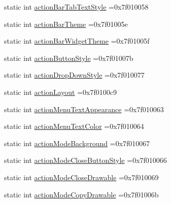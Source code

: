 \begin{DoxyCompactItemize}
\item 
static int \hyperlink{classandroid_1_1support_1_1graphics_1_1drawable_1_1animated_1_1R_1_1attr_a17cad979e945809355c270ab74105a21}{action\+Bar\+Tab\+Text\+Style} =0x7f010058
\item 
static int \hyperlink{classandroid_1_1support_1_1graphics_1_1drawable_1_1animated_1_1R_1_1attr_aa89584f12a04f4447018cd3eb7c0330d}{action\+Bar\+Theme} =0x7f01005e
\item 
static int \hyperlink{classandroid_1_1support_1_1graphics_1_1drawable_1_1animated_1_1R_1_1attr_a76a24821385225fbace8712d058fa8a2}{action\+Bar\+Widget\+Theme} =0x7f01005f
\item 
static int \hyperlink{classandroid_1_1support_1_1graphics_1_1drawable_1_1animated_1_1R_1_1attr_a45847dd7ab384af23da04459d99e0fa1}{action\+Button\+Style} =0x7f01007b
\item 
static int \hyperlink{classandroid_1_1support_1_1graphics_1_1drawable_1_1animated_1_1R_1_1attr_a2ef9988d482d2529b6d641459a8a83c5}{action\+Drop\+Down\+Style} =0x7f010077
\item 
static int \hyperlink{classandroid_1_1support_1_1graphics_1_1drawable_1_1animated_1_1R_1_1attr_a7f251e2bd4fc4623314f20d26a3c292c}{action\+Layout} =0x7f0100c9
\item 
static int \hyperlink{classandroid_1_1support_1_1graphics_1_1drawable_1_1animated_1_1R_1_1attr_af9f235290c841079f30759146f4108d6}{action\+Menu\+Text\+Appearance} =0x7f010063
\item 
static int \hyperlink{classandroid_1_1support_1_1graphics_1_1drawable_1_1animated_1_1R_1_1attr_aa4a600af765c1e79751967f00fd8aa1e}{action\+Menu\+Text\+Color} =0x7f010064
\item 
static int \hyperlink{classandroid_1_1support_1_1graphics_1_1drawable_1_1animated_1_1R_1_1attr_a4ec2434077e4165be480e3e660ac56ee}{action\+Mode\+Background} =0x7f010067
\item 
static int \hyperlink{classandroid_1_1support_1_1graphics_1_1drawable_1_1animated_1_1R_1_1attr_aa412b79bda304501e47cdf9102fc1dd7}{action\+Mode\+Close\+Button\+Style} =0x7f010066
\item 
static int \hyperlink{classandroid_1_1support_1_1graphics_1_1drawable_1_1animated_1_1R_1_1attr_ac96572b3583824971bd40b41f31d76fd}{action\+Mode\+Close\+Drawable} =0x7f010069
\item 
static int \hyperlink{classandroid_1_1support_1_1graphics_1_1drawable_1_1animated_1_1R_1_1attr_a100e73d355293b13cadafd3f871abcc8}{action\+Mode\+Copy\+Drawable} =0x7f01006b
\item 

\end{DoxyCompactItemize}
